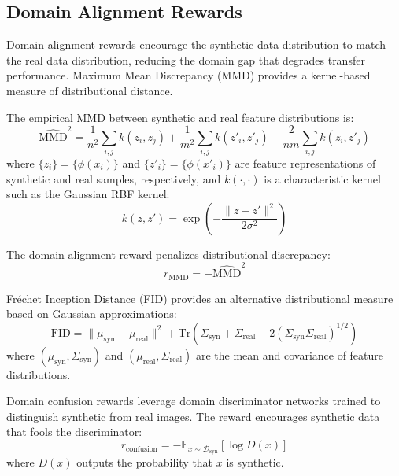 \subsection{Domain Alignment Rewards}

Domain alignment rewards encourage the synthetic data distribution to match the real data distribution, reducing the domain gap that degrades transfer performance. Maximum Mean Discrepancy (MMD) provides a kernel-based measure of distributional distance.

The empirical MMD between synthetic and real feature distributions is:
\begin{equation}
\widehat{\text{MMD}}^2 = \frac{1}{n^2} \sum_{i,j} k(z_i, z_j) + \frac{1}{m^2} \sum_{i,j} k(z'_i, z'_j) - \frac{2}{nm} \sum_{i,j} k(z_i, z'_j)
\label{eq:mmd}
\end{equation}
where $\{z_i\} = \{\phi(x_i)\}$ and $\{z'_i\} = \{\phi(x'_i)\}$ are feature representations of synthetic and real samples, respectively, and $k(\cdot, \cdot)$ is a characteristic kernel such as the Gaussian RBF kernel:
\begin{equation}
k(z, z') = \exp\left( -\frac{\|z - z'\|^2}{2\sigma^2} \right)
\label{eq:rbf_kernel}
\end{equation}

The domain alignment reward penalizes distributional discrepancy:
\begin{equation}
r_{\text{MMD}} = -\widehat{\text{MMD}}^2
\label{eq:mmd_reward}
\end{equation}

Fr\'{e}chet Inception Distance (FID) provides an alternative distributional measure based on Gaussian approximations:
\begin{equation}
\text{FID} = \|\mu_{\text{syn}} - \mu_{\text{real}}\|^2 + \text{Tr}\left( \Sigma_{\text{syn}} + \Sigma_{\text{real}} - 2(\Sigma_{\text{syn}} \Sigma_{\text{real}})^{1/2} \right)
\label{eq:fid}
\end{equation}
where $(\mu_{\text{syn}}, \Sigma_{\text{syn}})$ and $(\mu_{\text{real}}, \Sigma_{\text{real}})$ are the mean and covariance of feature distributions.

Domain confusion rewards leverage domain discriminator networks trained to distinguish synthetic from real images. The reward encourages synthetic data that fools the discriminator:
\begin{equation}
r_{\text{confusion}} = -\mathbb{E}_{x \sim \mathcal{D}_{\text{syn}}} \left[ \log D(x) \right]
\label{eq:domain_confusion}
\end{equation}
where $D(x)$ outputs the probability that $x$ is synthetic.

